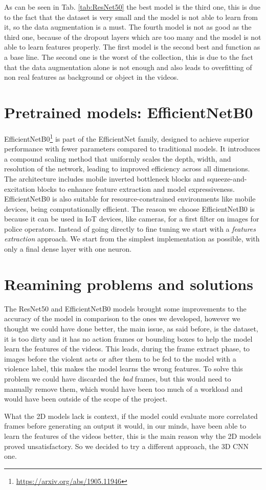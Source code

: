 As can be seen in Tab. \ref{tab:ResNet50} the best model is the third one, this is due to the fact that the dataset is very small and the model is not able to learn from it, so the data augmentation is a must. The fourth model is not as good as the third one, because of the dropout layers which are too many and the model is not able to learn features properly. The first model is the second best and function as a base line. The second one is the worst of the collection, this is due to the fact that the data augmentation alone is not enough and also leads to overfitting of non real features as background or object in the videos.

\section{Pretrained models: EfficientNetB0}
EfficientNetB0\footnote{\url{https://arxiv.org/abs/1905.11946}} is part of the EfficientNet family, designed to achieve superior performance with fewer parameters compared to traditional models.
It introduces a compound scaling method that uniformly scales the depth, width, and resolution of the network, leading to improved efficiency across all dimensions.
The architecture includes mobile inverted bottleneck blocks and squeeze-and-excitation blocks to enhance feature extraction and model expressiveness.
EfficientNetB0 is also suitable for resource-constrained environments like mobile devices, being computationally efficient. 
The reason we choose EfficientNetB0 is because it can be used in IoT devices, like cameras, for a first filter on images for police operators.
Instead of going directly to fine tuning we start with a \textit{features extraction} approach.
We start from the simplest implementation as possible, with only a final dense layer with one neuron. 

 
\section{Reamining problems and solutions} 
The ResNet50 and EfficientNetB0 models brought some improvements to the accuracy of the model in comparison to the ones we developed, however we thought we could have done better, the main issue, as said before, is the dataset, it is too dirty and it has no action frames or bounding boxes to help the model learn the features of the videos. This leads, during the frame extract phase, to images before the violent acts or after them to be fed to the model with a violence label, this makes the model learns the wrong features. To solve this problem we could have discarded the \textit{bad} frames, but this would need to manually remove them, which would have been too much of a workload and would have been outside of the scope of the project.

    What the 2D models lack is context, if the model could evaluate more correlated frames before generating an output it would, in our minds, have been able to learn the features of the videos better, this is the main reason why the 2D models proved unsatisfactory. So we decided to try a different approach, the 3D CNN one.